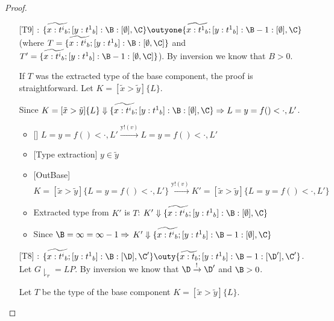 \begin{proof}
\begin{itemize}
\begin{itemize}
    
\end{itemize}


\end{itemize}




\begin{itemize}
\item [{[T9]}]: $\{\widetilde{x:{t^i}_b};[y:{t^1}_b]:\B:[\emptyset],\C\}\outyone \{\widetilde{x:{t^1}_b};[y:{t^1}_b]:\B-1:[\emptyset],\C\}$ (where $T=\{\widetilde{x:{t^i}_b};[y:{t^1}_b]:\B:[\emptyset,\C]\}$ and $T'=\{\widetilde{x:{t^i}_b};[y:{t^1}_b]:\B-1:[\emptyset,\C]\}$). By inversion we know that $B>0$.
    
    If $T$ was the extracted type of the base component, the proof is straightforward. Let $K=[\tilde{x}>\tilde{y}]\{L\}$.
    
    
    Since $K=[\tilde{x}>\tilde{y}]\{L\}\Downarrow \{\widetilde{x:{t^i}_b};[y:{t^1}_b]:\B:[\emptyset],\C\}\Rightarrow L=y=f()<\cdot,L'$. 
    
    \begin{itemize}
        \item {[]} $L=y=f()<\cdot,L'\xrightarrow{\text{y!}(v)}L=y=f()<\cdot,L'$
        \item {[Type extraction]} $y\in \widetilde{y}$
        \item {[OutBase]}\\ $K=[\tilde{x}>\tilde{y}]\{L=y=f()<\cdot,L'\}\xrightarrow{\text{y!}(v)} K'=[\tilde{x}>\tilde{y}]\{L=y=f()<\cdot,L'\}$
        \item Extracted type from $K'$ is $T$: $K'\Downarrow \{\widetilde{x:{t^i}_b};[y:{t^1}_b]:\B:[\emptyset],\C\}$
        \item Since $\B=\infty=\infty-1\Rightarrow$
        $K'\Downarrow \{\widetilde{x:{t^i}_b};[y:{t^1}_b]:\B-1:[\emptyset],\C\}$
        
        
        
        
    \end{itemize}
 
    
    
    
   \item [{[T8]}]: $\{\widetilde{x:{t^i}_b}; [y:{t^1}_b]:\B:[\D],\C'\}\outy \{\widetilde{x:t_b};[y:{t^1}_b]:\B-1:[\D'],\C'\}$. Let $G\downharpoonright_r=LP$. By inversion we know that $\D\xrightarrow{\text{!}}\D'$ and $\B>0$. 
   
  Let $T$ be the type of the base component $K=[\tilde{x}>\tilde{y}]\{L\}$.
   
   
   \begin{itemize}
   

\end{itemize}
\end{itemize}
\end{proof}
